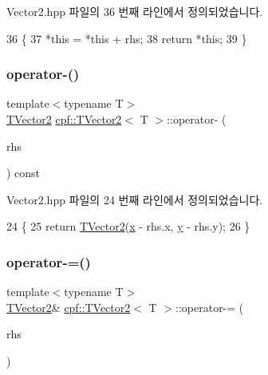 Vector2.\+hpp 파일의 36 번째 라인에서 정의되었습니다.


\begin{DoxyCode}
36                                                   \{
37             *\textcolor{keyword}{this} = *\textcolor{keyword}{this} + rhs;
38             \textcolor{keywordflow}{return} *\textcolor{keyword}{this};
39         \}
\end{DoxyCode}
\mbox{\label{classcpf_1_1_t_vector2_ac6262f8170df345618e7fa2f658952e3}} 
\subsubsection{\texorpdfstring{operator-\/()}{operator-()}}
{\footnotesize\ttfamily template$<$typename T$>$ \\
\hyperlink{classcpf_1_1_t_vector2}{T\+Vector2} \hyperlink{classcpf_1_1_t_vector2}{cpf\+::\+T\+Vector2}$<$ T $>$\+::operator-\/ (\begin{DoxyParamCaption}\item[{const \hyperlink{classcpf_1_1_t_vector2}{T\+Vector2}$<$ T $>$ \&}]{rhs }\end{DoxyParamCaption}) const\hspace{0.3cm}{\ttfamily [inline]}}



Vector2.\+hpp 파일의 24 번째 라인에서 정의되었습니다.


\begin{DoxyCode}
24                                                       \{
25             \textcolor{keywordflow}{return} \hyperlink{classcpf_1_1_t_vector2_aaed071ed32aa0e7fb5d8dc15e65aa2e5}{TVector2}(\hyperlink{classcpf_1_1_t_vector2_a2c0ac9258353351f1435070a2307e9e1}{x} - rhs.x, \hyperlink{classcpf_1_1_t_vector2_a727b923b39a876bbb13c810bcf6eecff}{y} - rhs.y);
26         \}
\end{DoxyCode}
\mbox{\label{classcpf_1_1_t_vector2_af1447b3026d2a071abed16bc68e578e1}} 
\subsubsection{\texorpdfstring{operator-\/=()}{operator-=()}}
{\footnotesize\ttfamily template$<$typename T$>$ \\
\hyperlink{classcpf_1_1_t_vector2}{T\+Vector2}\& \hyperlink{classcpf_1_1_t_vector2}{cpf\+::\+T\+Vector2}$<$ T $>$\+::operator-\/= (\begin{DoxyParamCaption}\item[{const \hyperlink{classcpf_1_1_t_vector2}{T\+Vector2}$<$ T $>$ \&}]{rhs }\end{DoxyParamCaption})\hspace{0.3cm}{\ttfamily [inline]}}



